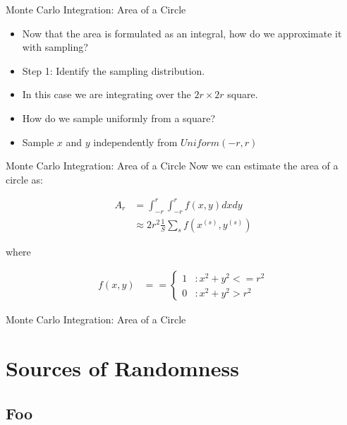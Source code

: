 \documentclass[serif,xcolor=pdftex,dvipsnames,table,hyperref={bookmarks=false,breaklinks}]{beamer}
\begin{document}
\begin{frame}[t]{Monte Carlo Integration: Area of a Circle}
	\begin{itemize}[<+->]
		\item Now that the area is formulated as an integral, how do we approximate it with sampling?
		\item Step 1: Identify the sampling distribution.
	\end{itemize}
	
	\pause
	\begin{itemize}[<+->]
		\item In this case we are integrating over the $2r \times 2r$ square.
		\item How do we sample uniformly from a square?
		\item Sample $x$ and $y$ independently from $Uniform(-r,r)$
	\end{itemize}
	
\end{frame}

\begin{frame}[t]{Monte Carlo Integration: Area of a Circle}
	Now we can estimate the area of a circle as:
	
	\begin{align*}
		A_r &= \int_{-r}^r \int_{-r}^r f(x,y) dx dy\\
		&\approx 2r^2 \frac{1}{S}\sum_s f(x^{(s)},y^{(s)})
	\end{align*}
	
	where
	
	\begin{align*}
		f(x,y) &= = \left\{
			\begin{array}{ll}
				1 & : x^2 + y^2 <= r^2\\
				0 & : x^2 + y^2 > r^2
			\end{array}
		\right.
	\end{align*}
	
\end{frame}

\begin{frame}[t]{Monte Carlo Integration: Area of a Circle}
\end{frame}


\section{Sources of Randomness}
\subsection{Foo}
\end{document}
